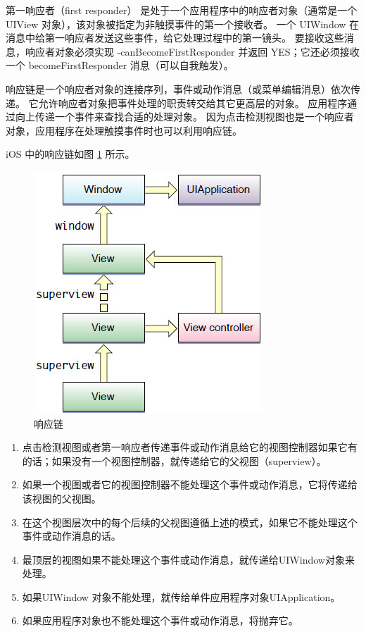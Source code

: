 第一响应者（first responder） 是处于一个应用程序中的响应者对象（通常是一个 UIView 对象），该对象被指定为非触摸事件的第一个接收者。
一个 UIWindow 在消息中给第一响应者发送这些事件，给它处理过程中的第一镜头。
要接收这些消息，响应者对象必须实现 -canBecomeFirstResponder 并返回 YES；它还必须接收一个 becomeFirstResponder 消息（可以自我触发）。

响应链是一个响应者对象的连接序列，事件或动作消息（或菜单编辑消息）依次传递。
它允许响应者对象把事件处理的职责转交给其它更高层的对象。
应用程序通过向上传递一个事件来查找合适的处理对象。
因为点击检测视图也是一个响应者对象，应用程序在处理触摸事件时也可以利用响应链。

iOS 中的响应链如图 \ref{responder-chain} 所示。

\begin{figure}[h!]
    \centering
    \includegraphics{figure/responder_chain.jpg}
    \caption{响应链}
    \label{responder-chain}
\end{figure}

\begin{enumerate}
    \item 点击检测视图或者第一响应者传递事件或动作消息给它的视图控制器如果它有的话；如果没有一个视图控制器，就传递给它的父视图（superview）。

    \item 如果一个视图或者它的视图控制器不能处理这个事件或动作消息，它将传递给该视图的父视图。

    \item 在这个视图层次中的每个后续的父视图遵循上述的模式，如果它不能处理这个事件或动作消息的话。

    \item 最顶层的视图如果不能处理这个事件或动作消息，就传递给UIWindow对象来处理。

    \item 如果UIWindow 对象不能处理，就传给单件应用程序对象UIApplication。

    \item 如果应用程序对象也不能处理这个事件或动作消息，将抛弃它。
\end{enumerate}

